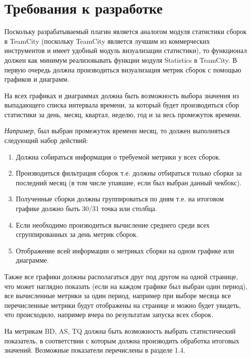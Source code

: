 \section{Требования к разработке} \label{ch1:sec6}

Поскольку разрабатываемый плагин является аналогом модуля статистики сборок в TeamCity (поскольку TeamCity является лучшим из коммерческих инструментов и имеет удобный модуль визуализации статистики), то функционал должен как минимум реализовывать функции модуля Statistics в TeamCity. В первую очередь должна производиться визуализация метрик сборок с помощью графиков и диаграмм.

На всех графиках и диаграммах должна быть возможность выбора значения из выпадающего списка интервала времени, за который будет производиться сбор статистики за день, месяц, квартал, неделю, год и за весь промежуток времени.

\textit{Например}, был выбран промежуток времени месяц, то должен выполняться следующий набор действий:

\begin{enumerate}
	\item Должна собираться информация о требуемой метрики у всех сборок.
	
	\item Производиться фильтрация сборок т.е. должны отбираться только сборки за последний месяц (в том числе упавшие, если был выбран данный чекбокс).
	
	\item Полученные сборки должны группироваться по дням т.е. на итоговом графике должно быть 30/31 точка или столбца.
	
	\item Если необходимо производиться вычисление среднего среди всех сгруппированных за день метрик сборок.
	
	\item Отображение всей информации о метриках сборки на одном графике или диаграмме.
	
	
\end{enumerate}

Также все графики должны располагаться друг под другом на одной странице, что может наглядно показать (если на каждом графике был выбран один период), все вычисленные метрики за один период, например при выборе месяца все перечисленные метрики будут отображены на странице и можно будет увидеть, что происходило, например вчера по результатам запуска всех сборок.

На метрикам BD, AS, TQ должна быть возможность выбрать статистический показатель, в соответствии с которым должна производить обработка итоговых значений. Возможные показатели перечислены в разделе 1.4.

